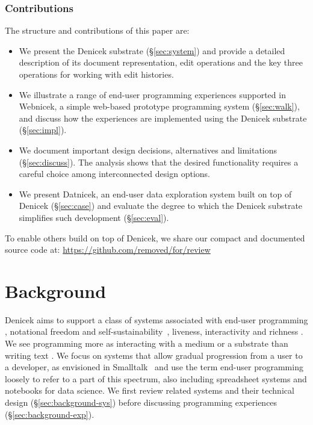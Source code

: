 \documentclass[sigconf,anonymous,screen]{acmart}
\begin{document}
\subsubsection*{Contributions}
The structure and contributions of this paper are:

\begin{itemize}
\item We present the Denicek substrate (\S\ref{sec:system}) and provide a detailed description of its
  document representation, edit operations and the key three operations for working with edit histories.
\item We illustrate a range of end-user programming experiences supported in Webnicek, a simple
  web-based prototype programming system (\S\ref{sec:walk}), and discuss how the experiences are
  implemented using the Denicek substrate (\S\ref{sec:impl}).
\item We document important design decisions, alternatives and limitations (\S\ref{sec:discuss}).
  The analysis shows that the desired functionality requires a careful choice among interconnected
  design options.
\item We present Datnicek, an end-user data exploration system built on top of Denicek (\S\ref{sec:case})
  and evaluate the degree to which the Denicek substrate simplifies such development (\S\ref{sec:eval}).
\end{itemize}

\noindent
To enable others build on top of Denicek, we share our compact and documented
source code at: \url{https://github.com/removed/for/review} %


\section{Background}
\label{sec:background}
Denicek aims to support a class of systems associated with end-user programming \cite{myers-2006-eup},
notational freedom and self-sustainability~\cite{jakubovic-2023-techdims}, liveness, interactivity
and richness \cite{horowitz-2023-qualities,rein-2019-live}. We see programming more as interacting with a medium
or a substrate \cite{kay-1977-media,klokmose-2015-webstrates} than writing text \cite{rpg-2012-revolution}.
We focus on systems that allow gradual progression from a user to a developer, as envisioned
in Smalltalk~\cite{reenskaug-1981-byte} and use the term end-user programming loosely to refer to a
part of this spectrum, also including spreadsheet systems and notebooks for data science.
We first review related systems and their technical design (\S\ref{sec:background-sys})
before discussing programming experiences (\S\ref{sec:background-exp}).
\end{document}
